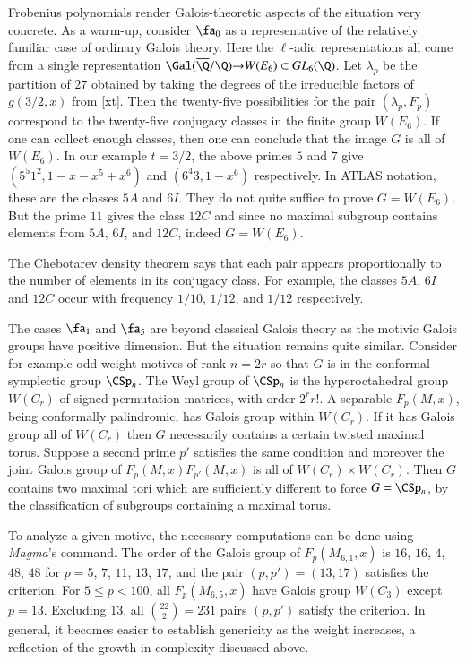 \documentclass{notices}
\numberwithin{equation}{section}
\numberwithin{table}{section}
\numberwithin{figure}{section}
\begin{document}
{  Frobenius polynomials render Galois-theoretic 
aspects of the situation very concrete.   As a warm-up, consider $\fa_0$ 
as a representative of the relatively familiar case of 
 ordinary Galois theory.  Here the $\ell$-adic representations all come from
a single representation $\Gal(\overline{\Q}/\Q) {\rightarrow} W(E_6) \subset GL_6(\Q)$.
Let $\lambda_p$ be the partition of $27$ obtained by taking the
degrees of the irreducible factors of $g(3/2,x)$ from \eqref{xt}.  Then
the twenty-five possibilities for the pair $(\lambda_p,F_p)$ 
correspond to the twenty-five conjugacy classes in the
finite group $W(E_6)$.   If one can collect 
enough classes, then one can conclude that 
the image $G$ is all of $W(E_6)$.  In our example $t=3/2$, 
the above primes $5$ and $7$ give $(5^5 1^2,1-x-x^5+x^6)$ and  $(6^4 3,1-x^6)$ respectively.
In ATLAS notation, these are the classes $5A$ and $6I$.  They do 
not quite suffice to prove $G=W(E_6)$.  But the prime $11$ gives the class $12C$ and 
since no maximal subgroup contains elements from $5A$, $6I$, and $12C$, indeed
$G=W(E_6)$.    

The Chebotarev density theorem
says that each pair appears proportionally to the
number of elements in its conjugacy class.  For example, 
the classes $5A$, $6I$ and $12C$ occur with frequency 
$1/10$, $1/12$, and $1/12$ respectively.   

The cases $\fa_1$ and $\fa_5$ are beyond classical
Galois theory as the motivic Galois groups have 
positive dimension.  But the situation remains quite 
similar.   Consider for example odd weight motives of 
rank $n=2r$ so that $G$ is in the conformal symplectic group
$\CSp_n$.   The Weyl group of $\CSp_n$ is the hyperoctahedral
group $W(C_r)$ of signed permutation matrices, with
order $2^r r!$.    
A separable $F_{p}(M,x)$, being conformally palindromic,
has Galois group within $W(C_r)$.   If it has
Galois group all of $W(C_r)$ then $G$ necessarily 
contains a certain twisted maximal torus.  Suppose a second
prime $p'$ satisfies the same condition and
moreover the joint Galois group of $F_p(M,x) F_{p'}(M,x)$
is all of $W(C_{r}) \times W(C_r)$.  Then $G$ contains
two maximal tori which are sufficiently different to force
$G = \CSp_n$, by the classification of subgroups 
containing a maximal torus.   

To analyze a given motive, the necessary computations can be 
done using {\em Magma}'s \verb@GaloisGroup@ 
command.   The order of the Galois group of $F_{p}(M_{6,1},x)$ 
is $16$, $16$, $4$, $48$, $48$ for $p=5$, $7$, $11$, $13$, 
$17$, and the pair $(p,p') = (13,17)$ satisfies 
the criterion.   For $5 \leq p < 100$, all $F_p(M_{6,5},x)$ have
Galois group $W(C_3)$ except $p=13$.  Excluding 
13, all $\binom{22}{2} = 231$ pairs $(p,p')$ satisfy
the criterion.   In general, it becomes easier to establish
genericity as the weight increases, a reflection of the 
growth in complexity discussed above.

}
\end{document}
